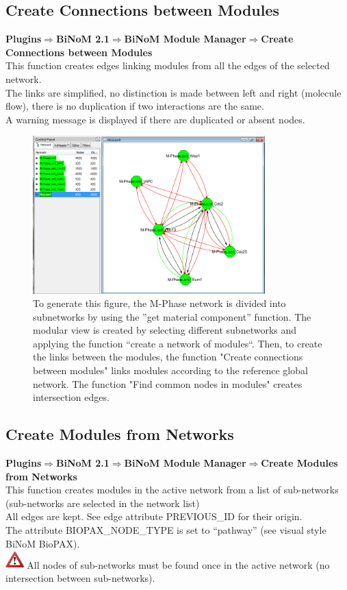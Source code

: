 \subsection{Create Connections between Modules}
\textbf{Plugins$\Rightarrow$BiNoM 2.1$\Rightarrow$BiNoM Module Manager$\Rightarrow$Create Connections between Modules}\\
This function creates edges linking modules from all the edges of the selected network.\\
The links are simplified, no distinction is made between left and right (molecule flow), there is no duplication if two interactions are the same.\\
A warning message is displayed if there are duplicated or absent nodes.

\begin{figure}
\centering
\includegraphics[width=0.8\textwidth]{graphics/M-Phase_Material_Modular}
\caption{To generate this figure, the M-Phase network is divided into
subnetworks by using the ''get material component'' function. The modular view
is created by selecting different subnetworks and applying the function ``create a network of modules``. Then, to create the links between the modules, the function "Create
connections between modules" links modules according to the reference global network. The function "Find common nodes in modules" creates intersection edges.}
\label{M-Phase_Material_Modular}
\end{figure}

\subsection{Create Modules from Networks}
\textbf{Plugins$\Rightarrow$BiNoM 2.1$\Rightarrow$BiNoM Module Manager$\Rightarrow$Create Modules from Networks}\\
This function creates modules in the active network from a list of sub-networks (sub-networks are selected in the network list)\\
All edges are kept. See edge attribute PREVIOUS\_ID for their origin.\\
The attribute BIOPAX\_NODE\_TYPE is set to “pathway” (see visual style BiNoM BioPAX).\\
\includegraphics[width=20pt,height=20pt]{graphics/warning} All nodes of sub-networks must be found once in the active network (no intersection between sub-networks).

